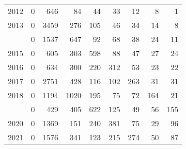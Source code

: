 \documentclass[
]{article}
\begin{document}
\begin{longtable}[t]{lrrrrrrrr}
2012 & 0 & 646 & 84 & 44 & 33 & 12 & 8 & 1\\
2013 & 0 & 3459 & 276 & 105 & 46 & 34 & 14 & 8\\
\addlinespace
2014 & 0 & 1537 & 647 & 92 & 68 & 38 & 24 & 11\\
2015 & 0 & 605 & 303 & 598 & 88 & 47 & 27 & 24\\
2016 & 0 & 634 & 300 & 220 & 312 & 53 & 23 & 22\\
2017 & 0 & 2751 & 428 & 116 & 102 & 263 & 31 & 31\\
2018 & 0 & 1194 & 1020 & 195 & 75 & 72 & 164 & 21\\
\addlinespace
2019 & 0 & 429 & 405 & 622 & 125 & 49 & 56 & 155\\
2020 & 0 & 1369 & 151 & 240 & 381 & 75 & 29 & 96\\
2021 & 0 & 1576 & 341 & 123 & 215 & 274 & 50 & 87\\*
\end{longtable}
\end{document}
